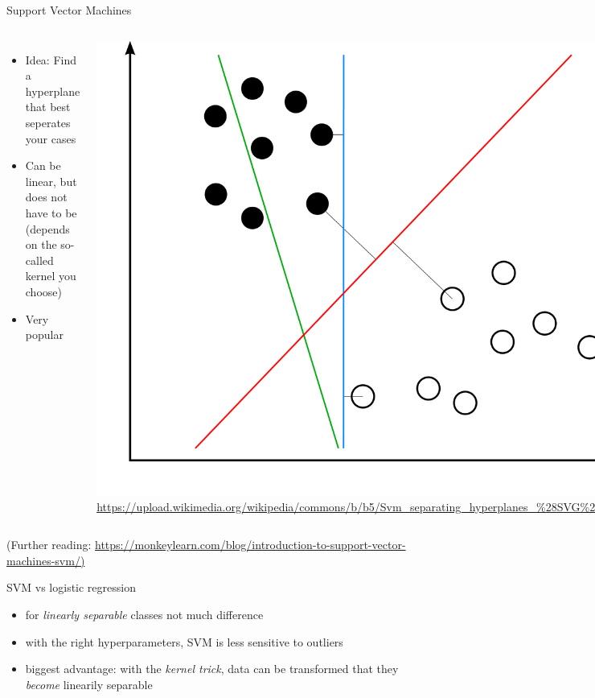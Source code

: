 \documentclass[compress]{beamer}
\begin{document}
\begin{frame}{Support Vector Machines}
	\begin{columns}
		\begin{itemize}
			\item	Idea: Find a hyperplane that best seperates your cases
			\item Can be linear, but does not have to be (depends on the so-called kernel you choose)
			\item Very popular 
		\end{itemize}
		\includegraphics[width=.8\linewidth,height=.5\paperheight,keepaspectratio]{../pictures/svm}
		\tiny{\url{https://upload.wikimedia.org/wikipedia/commons/b/b5/Svm\_separating\_hyperplanes\_\%28SVG\%29.svg}}
	\end{columns}
	\vfill
	\footnotesize{(Further reading: \url{https://monkeylearn.com/blog/introduction-to-support-vector-machines-svm/)}}
\end{frame}

\begin{frame}{SVM vs logistic regression}
\begin{itemize}
	\item for \emph{linearly separable} classes not much difference
	\item with the right hyperparameters, SVM is less sensitive to outliers
	\item biggest advantage: with the \emph{kernel trick}, data can be transformed that they \emph{become} linearily separable
\end{itemize}
\end{frame}
\end{document}
